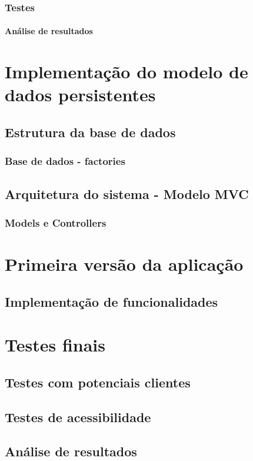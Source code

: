 \documentclass[11pt, twoside]{report}
\begin{document}
	\subsection{Testes}
	\subsubsection{Análise de resultados}
	
	\chapter{Implementação do modelo de dados persistentes}
	\section{Estrutura da base de dados}
	\subsection{Base de dados - factories}
	\section{Arquitetura do sistema - Modelo MVC}
	\subsection{Models e Controllers}
	
	\chapter{Primeira versão da aplicação}
	\section{Implementação de funcionalidades}
	
	\chapter{Testes finais}
	\section{Testes com potenciais clientes}
	\section{Testes de acessibilidade}
	\section{Análise de resultados}
	
\end{document}
